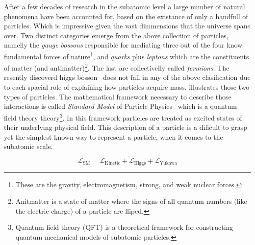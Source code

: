 After a few decades of research in the subatomic level a large number of natural phenomena have been accounted
for, based on the existance of only a handfull of particles. Which is impressive given the vast dimmensions that the
universe spans over. Two distinct categories emerge from the above collection of particles, namelly the {\it gauge
bossons} responsible for mediating three out of the four know fundamental forces of
nature\footnote{These are the gravity, electromagnetism, strong, and weak nuclear forces.}, and {\it quarks} plus {\it leptons} which are the
constituents of matter
(and antimatter)\footnote{Anitmatter is a state of matter where the signs of all quantum numbers (like the electric charge) of a particle are fliped.}.
The last are collectivelly called {\it fermions}. The resently discoverd higgs bosson~\cite{higgs-cms,higgs-atlas} does not fall in any of the above clasification due to each spacial role of
explaining how particles acquire mass.  illustrates those two types of particles.
The mathematical framework necessary to describe those interactions is called \textit{Standard Model} of Particle Physics~\cite{sm-glashow,sm-weinberg,sm-salam}
which is a quantum field theory
theory\footnote{Quantum field theory (QFT) is a theoretical framework for constructing quantum mechanical models of subatomic particles.}.
In this framework particles are treated as excited states of their underlying physical field. This description of a particle  is a dificult
to grasp yet the simplest known way to represent a particle, when it comes to the subatomic scale.

\begin{equation}
\mathscr{L}_{\text{SM}} =
\mathscr{L}_{\text{Kinetic}} + \mathscr{L}_{\text{Higgs}} + \mathscr{L}_{\text{Yukawa}}
\label{lagrangian}
\end{equation}


